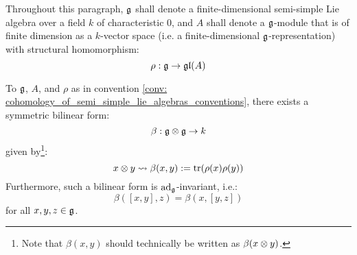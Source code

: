                     \begin{convention} \label{conv: cohomology_of_semi_simple_lie_algebras_conventions}
                        Throughout this paragraph, $\mathfrak{g}$ shall denote a finite-dimensional semi-simple Lie algebra over a field $k$ of characteristic $0$, and $A$ shall denote a $\mathfrak{g}$-module that is of finite dimension as a $k$-vector space (i.e. a finite-dimensional $\mathfrak{g}$-representation) with structural homomorphism:
                            $$\rho: \mathfrak{g} \to \mathfrak{gl}(A)$$
                    \end{convention}
                    
                    \begin{proposition} \label{prop: associated_invariant_bilinear_forms_of_lie_algebras}
                        To $\mathfrak{g}$, $A$, and $\rho$ as in convention \ref{conv: cohomology_of_semi_simple_lie_algebras_conventions}, there exists a symmetric bilinear form:
                            $$\beta: \g \tensor \g \to k$$
                        given by\footnote{Note that $\beta(x, y)$ should technically be written as $\beta(x \tensor y)$.}:
                            $$x \tensor y \mapsto \beta(x, y) := \trace(\rho(x) \rho(y))$$
                        Furthermore, such a bilinear form is $\mathrm{ad}_{\mathfrak{g}}$-invariant, i.e.:
                            $$\beta([x, y], z) = \beta(x, [y, z])$$
                        for all $x, y, z \in \mathfrak{g}$.
                    \end{proposition}
